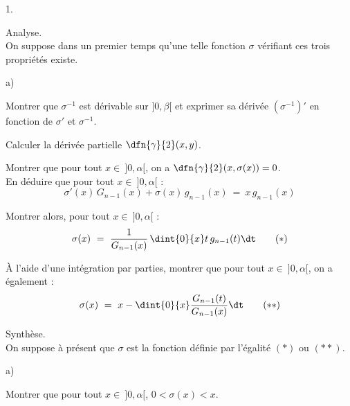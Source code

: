 \begin{noliste}{1.}
  \setlength{\itemsep}{4mm}
  \setcounter{enumi}{5}
  \item Analyse.\\
  On suppose dans un premier temps qu'une telle fonction $\sigma$ 
  vérifiant ces trois propriétés existe.
  \begin{noliste}{a)}
    \setlength{\itemsep}{2mm}
    \item Montrer que $\sigma^{-1}$ est dérivable sur $]0,\beta[$ et 
    exprimer sa dérivée $(\sigma^{-1})'$ en fonction de $\sigma'$
    et $\sigma^{-1}$.
    
    
    
    

    
    \item Calculer la dérivée partielle $\dfn{\gamma}{2}(x, y)$.
    
    

    \item Montrer que pour tout $x \in \ ]0, \alpha[$, on a 
    $\dfn{\gamma}{2}(x, \sigma(x))=0$.\\
    En déduire que pour tout $x \in \ ]0, \alpha[$ : 
    \[
      \sigma'(x) \, G_{n-1}(x) + \sigma(x) \, g_{n-1}(x) \ = \
      x \, g_{n-1}(x)
    \]
    
    

    
    \item Montrer alors, pour tout $x \in \ ]0,\alpha[$ : 
    \[
      \sigma(x) \ = \ \dfrac{1}{G_{n-1}(x)} \, \dint{0}{x} t \, 
      g_{n-1}(t) \dt \qquad (*)
    \]
    
    
    
    \item À l'aide d'une intégration par parties, montrer que pour tout
    $x \in \ ]0,\alpha[$, on a également : 
    \[
      \sigma(x) \ = \ x - \dint{0}{x} \dfrac{G_{n-1}(t)}{G_{n-1}(x)}
      \dt \qquad (**)
    \]
    
    
  \end{noliste}
  
  \item Synthèse.\\
  On suppose à présent que $\sigma$ est la fonction définie par 
  l'égalité $(*)$ ou $(**)$.
  \begin{noliste}{a)}
    \setlength{\itemsep}{2mm}
    \item Montrer que pour tout $x \in \ ]0, \alpha[$, $0 < \sigma(x)
    <x$.
    
    


\end{noliste}
\end{noliste}
